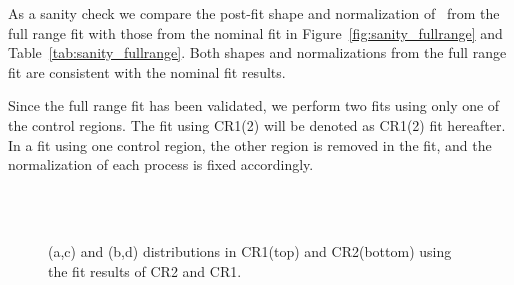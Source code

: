 As a sanity check we compare the post-fit shape and normalization of \qqww\
from the full range fit with those from the nominal fit in 
Figure~\ref{fig:sanity_fullrange} and Table~\ref{tab:sanity_fullrange}. 
Both shapes and normalizations from the full range fit 
are consistent with the nominal fit results. 

Since the full range fit has been validated, 
we perform two fits using only one of the control regions.
The fit using CR1(2) will be denoted as CR1(2) fit hereafter. 
In a fit using one control region, 
the other region is removed in the fit, and the normalization of each process 
is fixed accordingly. 

\begin{figure}[!hbtp]
\centering
{}
\\
\\
\caption{\mll(a,c) and \mT(b,d) distributions in CR1(top) and CR2(bottom) 
using the fit results of CR2 and CR1.}
\label{fig:wwctl_final}
\end{figure}

